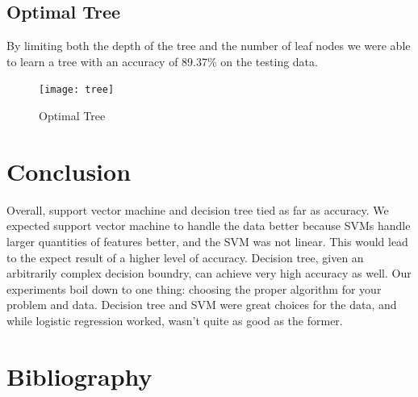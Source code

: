 \documentclass{article} %
\begin{document}
\subsection{Optimal Tree}
By limiting both the depth of the tree and the number of leaf nodes we were able to learn a tree with an accuracy of 89.37\% on the testing data. 
\begin{figure}[H]
\texttt{[image: tree]}
\caption{Optimal Tree}
\end{figure}

\section{Conclusion}
Overall, support vector machine and decision tree tied as far as accuracy. We expected
support vector machine to handle the data better because SVMs handle larger quantities
of features better, and the SVM was not linear. This would lead to the expect result
of a higher level of accuracy. Decision tree, given an arbitrarily complex decision
boundry, can achieve very high accuracy as well. Our experiments boil down to one
thing: choosing the proper algorithm for your problem and data. Decision tree
and SVM were great choices for the data, and while logistic regression worked, wasn't
quite as good as the former.

\clearpage

\section{Bibliography}


\end{document}
